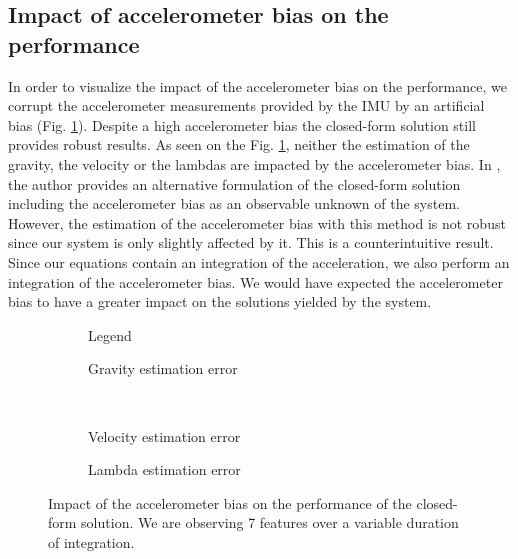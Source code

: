 \documentclass[letterpaper, 10 pt, conference]{ieeeconf}  %
\begin{document}
\subsection{Impact of accelerometer bias on the performance}
In order to visualize the impact of the accelerometer bias on the performance,
we corrupt the accelerometer measurements provided by the IMU by an artificial bias (Fig. \ref{fig:biasAccCF}).
Despite a high accelerometer bias the closed-form solution still provides robust results.
As seen on the Fig. \ref{fig:biasAccCF}, neither the estimation of the gravity, the velocity or the lambdas are impacted by the accelerometer bias.
In \cite{Martinelli2014}, the author provides an alternative formulation of the closed-form solution including the accelerometer bias as an observable unknown of the system.
However, the estimation of the accelerometer bias with this method is not robust since our system is only slightly affected by it.
This is a counterintuitive result. Since our equations contain an integration of the acceleration, we also perform an integration of the accelerometer bias.
We would have expected the accelerometer bias to have a greater impact on the solutions yielded by the system.


\begin{figure}
  \centering
        \hspace{0.2\columnwidth}%
        \begin{subfigure}[b]{0.3\columnwidth}
                \resizebox{\columnwidth}{!}{}
                \caption{Legend}

        \end{subfigure}%
        \begin{subfigure}[b]{0.5\columnwidth}
                \resizebox{\columnwidth}{!}{}
                \caption{Gravity estimation error}

        \end{subfigure}
        ~
        \begin{subfigure}[b]{0.5\columnwidth}
                \resizebox{\columnwidth}{!}{}
                \caption{Velocity estimation error}

        \end{subfigure}%
        \begin{subfigure}[b]{0.5\columnwidth}
                \resizebox{\columnwidth}{!}{}
                \caption{Lambda estimation error}

        \end{subfigure}
        \caption{Impact of the accelerometer bias on the performance of the closed-form solution. We are observing 7 features  over a variable duration of integration.\label{fig:biasAccCF}}
\end{figure}
\end{document}
